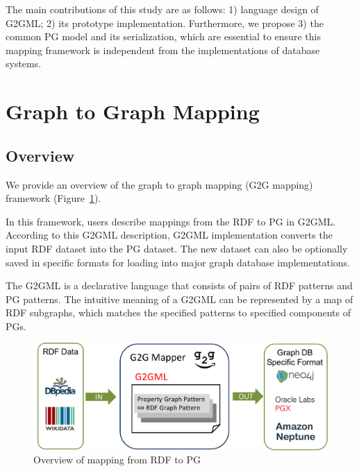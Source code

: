\documentclass[runningheads]{llncs}
\begin{document}

The main contributions of this study are as follows: 1) language design of G2GML; 2) its prototype implementation. Furthermore, we propose 3) the common PG model and its serialization, which are essential to ensure this mapping framework is independent from the implementations of database systems.

\section{Graph to Graph Mapping}

\subsection{Overview}

We provide an overview of the graph to graph mapping (G2G mapping) framework (Figure~\ref{fig:dataflow}).

In this framework, users describe mappings from the RDF to PG in G2GML.
According to this G2GML description, G2GML implementation converts the input RDF dataset into the PG dataset. The new dataset can also be optionally saved in specific formats for loading into major graph database implementations.

The G2GML is a declarative language that consists of pairs of RDF patterns and PG patterns. 
The intuitive meaning of a G2GML can be represented by a map of RDF subgraphs, which matches the specified patterns to specified components of PGs.



 
\begin{figure}
\center
\includegraphics[width=1.0\textwidth]{dataflow.png}
\caption{Overview of mapping from RDF to PG}
\label{fig:dataflow}
\end{figure}
\end{document}
